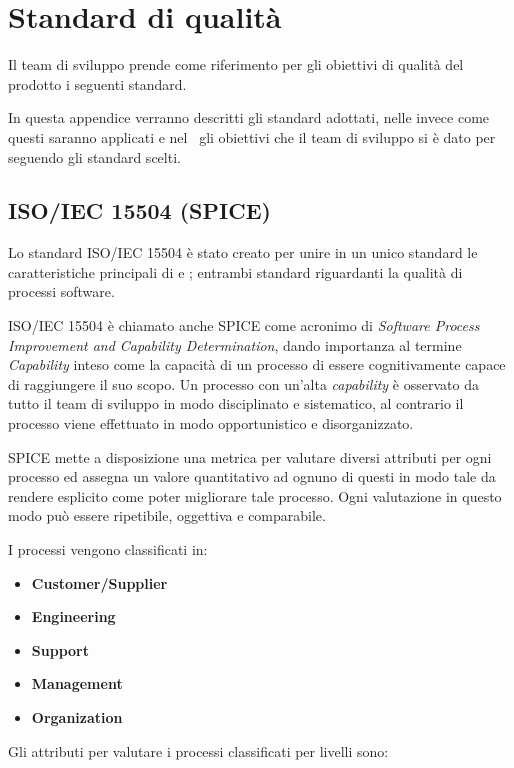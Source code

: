 \newpage
\section{Standard di qualità}
Il team di sviluppo prende come riferimento per gli obiettivi di qualità del prodotto i seguenti standard.

In questa appendice verranno descritti gli standard adottati, nelle \NdP\D invece come questi saranno applicati e nel \PdQ~gli obiettivi che il team di sviluppo si è dato per seguendo gli standard scelti.

	\subsection{ISO/IEC 15504 (SPICE)}
	Lo standard ISO/IEC 15504 è stato creato per unire in un unico standard le caratteristiche principali di  e ; entrambi standard riguardanti la qualità di processi software.
	
	ISO/IEC 15504 è chiamato anche SPICE come acronimo di \textit{Software Process Improvement and Capability Determination}, dando importanza al termine \textit{Capability} inteso come la capacità di un processo di essere cognitivamente capace di raggiungere il suo scopo. Un processo con un'alta \textit{capability} è osservato da tutto il team di sviluppo in modo disciplinato e sistematico, al contrario il processo viene effettuato in modo opportunistico e disorganizzato.
	
	SPICE mette a disposizione una metrica per valutare diversi attributi per ogni processo ed assegna un valore quantitativo ad ognuno di questi in modo tale da rendere esplicito come poter migliorare tale processo. Ogni valutazione in questo modo può essere ripetibile, oggettiva e comparabile.
	
	I processi vengono classificati in:
	
	\begin{itemize}
		\item \textbf{Customer/Supplier}
		\item \textbf{Engineering}
		\item \textbf{Support}
		\item \textbf{Management}
		\item \textbf{Organization}
	\end{itemize}
	
	Gli attributi per valutare i processi classificati per livelli sono:
	
